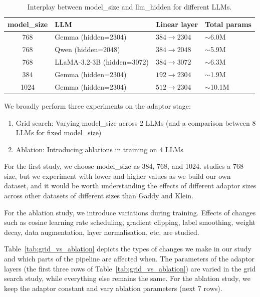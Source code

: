 \begin{table}[ht]
\centering
\caption{Interplay between model\_size and llm\_hidden for different LLMs.}
\label{tab:llm_hidden}
\begin{tabular}{clll}
\toprule
\textbf{model\_size} & \textbf{LLM} & \textbf{Linear layer} & \textbf{Total params} \\
\midrule
768  & Gemma (hidden=2304)   & $384 \to 2304$ & $\sim$6.0M \\
768  & Qwen (hidden=2048)    & $384 \to 2048$ & $\sim$5.9M \\
768  & LLaMA-3.2-3B (hidden=3072)& $384 \to 3072$ & $\sim$6.3M \\
384  & Gemma (hidden=2304)   & $192 \to 2304$ & $\sim$1.9M \\
1024 & Gemma (hidden=2304)   & $512 \to 2304$ & $\sim$10.1M \\
\bottomrule
\end{tabular}
\end{table}

We broadly perform three experiments on the adaptor stage:

\begin{enumerate}
    \item Grid search: Varying model\_size across 2 LLMs (and a comparison between 8 LLMs for fixed model\_size)
    \item Ablation: Introducing ablations in training on 4 LLMs
\end{enumerate}

For the first study, we choose model\_size as 384, 768, and 1024. \citet{mohapatra2025} studies a 768 size, but we experiment with lower and higher values as we build our own dataset, and it would be worth understanding the effects of different adaptor sizes across other datasets of different sizes than Gaddy and Klein.

For the ablation study, we introduce variations during training. Effects of changes such as cosine learning rate scheduling, gradient clipping, label smoothing, weight decay, data augmentation, layer normalisation, etc, are studied.

Table~\ref{tab:grid_vs_ablation} depicts the types of changes we make in our study and which parts of the pipeline are affected when. The parameters of the adaptor layers (the first three rows of Table~\ref{tab:grid_vs_ablation}) are varied in the grid search study, while everything else remains the same. For the ablation study, we keep the adaptor constant and vary ablation parameters (next 7 rows).

